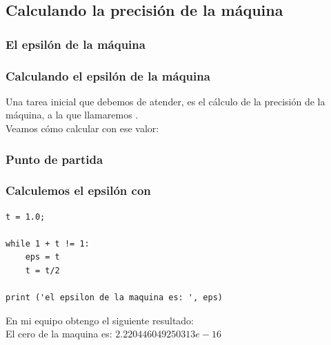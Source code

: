 \subsection{Calculando la precisión de la máquina}
\begin{frame}
\frametitle{El epsilón de la máquina}
\begin{figure}
\centering

\end{figure}
\end{frame}
\begin{frame}
\frametitle{Calculando el epsilón de la máquina}
Una tarea inicial que debemos de atender, es el cálculo de la precisión de la máquina, a la que llamaremos  .
\\
\bigskip
\pause
Veamos cómo calcular con \python ese valor:
\end{frame}
\begin{frame}
\frametitle{Punto de partida}
\fontsize{10}{10}\selectfont
\begin{figure}
\centering

\end{figure}
\end{frame}
\begin{frame}[fragile]
\frametitle{Calculemos el epsilón con \python}
\begin{lstlisting}[style= FormattedNumber, basicstyle=\linespread{0.9}\ttfamily\normalsize, columns=fullflexible]
t = 1.0;

while 1 + t != 1:
    eps = t
    t = t/2

print ('el epsilon de la maquina es: ', eps)
\end{lstlisting}
\pause
En mi equipo obtengo el siguiente resultado:
\\
El cero de la maquina es:  $2.220446049250313e-16$
\end{frame}
